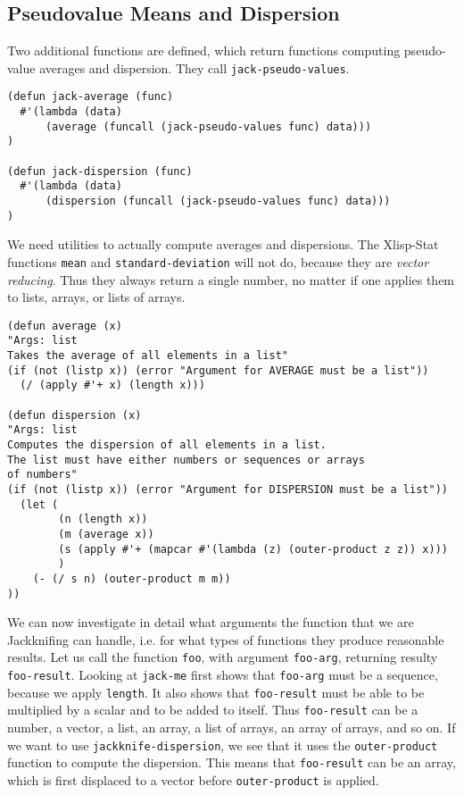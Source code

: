 \documentclass{amsart}
\theoremstyle{definition}
\theoremstyle{remark}
\numberwithin{equation}{section}
\begin{document}
\subsection{Pseudovalue Means and Dispersion}
%
Two additional functions are defined, which return functions
computing pseudo-value averages and dispersion. They call
\texttt{jack-pseudo-values}.
%
\begin{verbatim}
(defun jack-average (func)
  #'(lambda (data)
      (average (funcall (jack-pseudo-values func) data)))
)

(defun jack-dispersion (func)
  #'(lambda (data)
      (dispersion (funcall (jack-pseudo-values func) data)))
)
\end{verbatim}
%
We need utilities to actually compute averages and dispersions.
The Xlisp-Stat functions \texttt{mean} and
\texttt{standard-deviation} will not do, because they are
\emph{vector reducing}. Thus they always return a single number,
no matter if one applies them to lists, arrays, or lists of
arrays.
%
\begin{verbatim}
(defun average (x)
"Args: list
Takes the average of all elements in a list"
(if (not (listp x)) (error "Argument for AVERAGE must be a list"))
  (/ (apply #'+ x) (length x)))

(defun dispersion (x)
"Args: list
Computes the dispersion of all elements in a list.
The list must have either numbers or sequences or arrays
of numbers"
(if (not (listp x)) (error "Argument for DISPERSION must be a list"))
  (let (
        (n (length x))
        (m (average x))
        (s (apply #'+ (mapcar #'(lambda (z) (outer-product z z)) x)))
        )
    (- (/ s n) (outer-product m m))
))
\end{verbatim}
%
We can now investigate in detail what arguments the function that we
are Jackknifing can handle,
i.e. for what types of functions they produce reasonable results. Let us
call the function \texttt{foo}, with argument \texttt{foo-arg}, returning
resulty \texttt{foo-result}. Looking at \texttt{jack-me} first
shows that \texttt{foo-arg} must be a sequence, because
we apply \texttt{length}. It also shows that
\texttt{foo-result} must be able to be multiplied by a scalar and to be
added to itself. Thus \texttt{foo-result} can be a number, a vector,
a list, an array, a list of arrays, an array of arrays, and so on.
If we want to use \texttt{jackknife-dispersion}, we see that it
uses the \texttt{outer-product} function to compute the dispersion.
This means that \texttt{foo-result} can be an array, which is first
displaced to a vector before \texttt{outer-product} is applied.\par
\end{document}
